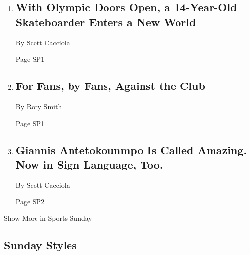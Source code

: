 \begin{enumerate}
\def\labelenumi{\arabic{enumi}.}
\item
  \href{/2019/11/29/sports/young-skateboarders.html}{}

  \hypertarget{with-olympic-doors-open-a-14-year-old-skateboarder-enters-a-new-world}{%
  \subsection{With Olympic Doors Open, a 14-Year-Old Skateboarder Enters
  a New
  World}\label{with-olympic-doors-open-a-14-year-old-skateboarder-enters-a-new-world}}

  By Scott Cacciola

  Page SP1
\item
  \href{/2019/11/28/sports/arsenal-fan-tv.html}{}

  \hypertarget{for-fans-by-fans-against-the-club}{%
  \subsection{For Fans, by Fans, Against the
  Club}\label{for-fans-by-fans-against-the-club}}

  By Rory Smith

  Page SP1
\item
  \href{/2019/11/29/sports/milwaukee-bucks-sign-language.html}{}

  \hypertarget{giannis-antetokounmpo-is-called-amazing-now-in-sign-language-too}{%
  \subsection{Giannis Antetokounmpo Is Called Amazing. Now in Sign
  Language,
  Too.}\label{giannis-antetokounmpo-is-called-amazing-now-in-sign-language-too}}

  By Scott Cacciola

  Page SP2
\end{enumerate}

Show More in Sports Sunday

\hypertarget{sunday-styles}{%
\subsection{Sunday Styles}\label{sunday-styles}}

